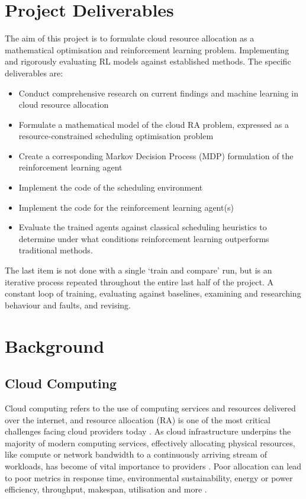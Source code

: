 \documentclass[12pt]{article}
\begin{document}
\newpage
\section{Project Deliverables}
The aim of this project is to formulate cloud resource allocation as a mathematical optimisation and reinforcement learning problem. Implementing and rigorously evaluating RL models against established methods. The specific deliverables are:
\begin{itemize}
    \item Conduct comprehensive research on current findings and machine learning in cloud resource allocation
    \item Formulate a mathematical model of the cloud RA problem, expressed as a resource-constrained scheduling optimisation problem
    \item Create a corresponding Markov Decision Process (MDP) formulation of the reinforcement learning agent
    \item Implement the code of the scheduling environment
    \item Implement the code for the reinforcement learning agent(s)
    \item Evaluate the trained agents against classical scheduling heuristics to determine under what conditions reinforcement learning outperforms traditional methods.
\end{itemize}
The last item is not done with a single `train and compare' run, but is an iterative process repeated throughout the entire last half of the project. A constant loop of training, evaluating against baselines, examining and researching behaviour and faults, and revising.

\section{Background}
\subsection{Cloud Computing}
Cloud computing refers to the use of computing services and resources delivered over the internet, and resource allocation (RA) is one of the most critical challenges facing cloud providers today \cite{saidi2023, huawei2022}. As cloud infrastructure underpins the majority of modern computing services, effectively allocating physical resources, like compute or network bandwidth to a continuously arriving stream of workloads, has become of vital importance to providers \cite{sdn2021}. Poor allocation can lead to poor metrics in response time, environmental sustainability, energy or power efficiency, throughput, makespan, utilisation and more \cite{cloudkpi2010, dvbpp2026, mohamaddiah2014, anuradha2014}.
\end{document}
